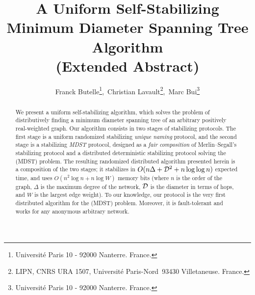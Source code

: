 \documentclass[10pt]{article}
\begin{document}
\title{A Uniform Self-Stabilizing \\
Minimum Diameter Spanning Tree Algorithm \\
{\small (Extended Abstract)}}

\author{Franck Butelle\thanks{Universit\'{e} Paris 10 
- 92000 Nanterre. France.},\  
Christian Lavault\thanks{LIPN, CNRS URA 1507, 
Universit\'{e} Paris-Nord\ 93430 Villetaneuse. France.},\ 
Marc Bui\thanks{Universit\'{e} Paris 10 - 92000 Nanterre. France.}
}
\date{\empty}
\maketitle

\begin{abstract}
We present a uniform self-stabilizing algorithm, which solves the
problem of distributively finding a minimum diameter spanning tree of
an arbitrary positively real-weighted graph. Our algorithm consists
in two stages of stabilizing protocols. The first stage is a uniform
randomized stabilizing {\em unique naming} protocol, and the second
stage is a stabilizing {\em MDST} protocol, designed as a {\em fair
composition} of Merlin--Segall's stabilizing protocol and a
distributed deterministic stabilizing protocol solving the (MDST)
problem. The resulting randomized distributed algorithm presented
herein is a composition of the two stages; it stabilizes in
$O(n\Delta+{\cal D}^2+ n \log\log n)$ expected time, and uses $O(n^2
\log n + n \log W)$ memory bits (where $n$ is the order of
the graph, $\Delta$ is the maximum degree of the network, $\cal D$
is the diameter in terms of hops, and $W$ is
the largest edge weight). To our knowledge, our protocol is the very
first distributed algorithm for the (MDST) problem. Moreover, it is
fault-tolerant and works for any anonymous arbitrary network.
\end{abstract}
\end{document}

